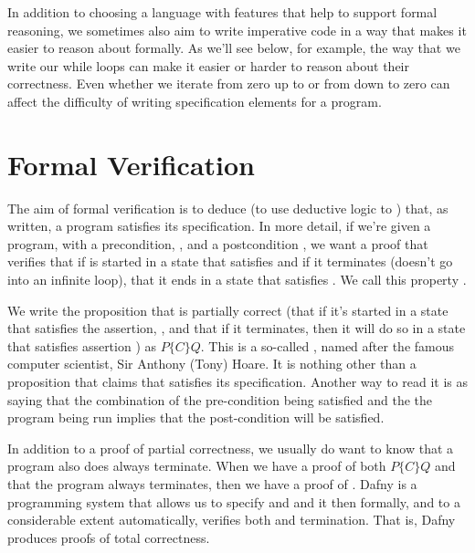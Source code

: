 \documentclass[letterpaper,10pt,english]{sphinxmanual}
\begin{document}
In addition to choosing a language with features that help to support
formal reasoning, we sometimes also aim to write imperative code in a
way that makes it easier to reason about formally. As we’ll see below,
for example, the way that we write our while loops can make it easier
or harder to reason about their correctness. Even whether we iterate
from zero up to  or from  down to zero can affect the difficulty
of writing specification elements for a program.


\section{Formal Verification}
\label{\detokenize{05-putting-it-together:formal-verification}}
The aim of formal verification is to deduce (to use deductive logic to
) that, as written, a program satisfies its specification.  In
more detail, if we’re given a program,  with a precondition, ,
and a postcondition , we want a proof that verifies that if  is
started in a state that satisfies  and if it terminates (doesn’t go
into an infinite loop), that it ends in a state that satisfies . We
call this property .

We write the proposition that  is partially correct (that if it’s
started in a state that satisfies the assertion, , and that if it
terminates, then it will do so in a state that satisfies assertion
) as \(P \{ C \} Q.\) This is a so-called , named
after the famous computer scientist, Sir Anthony (Tony) Hoare. It is
nothing other than a proposition that claims that  satisfies its
 specification. Another way to read it
is as saying that the combination of the pre-condition being satisfied
and the the program being run implies that the post-condition will be
satisfied.

In addition to a proof of partial correctness, we usually do want to
know that a program also does always terminate. When we have a proof
of both \(P \{ C \} Q\) and that the program always terminates,
then we have a proof of . Dafny is a programming
system that allows us to specify  and  and it then formally, and
to a considerable extent automatically, verifies both 
and termination.  That is, Dafny produces proofs of total correctness.
\end{document}
